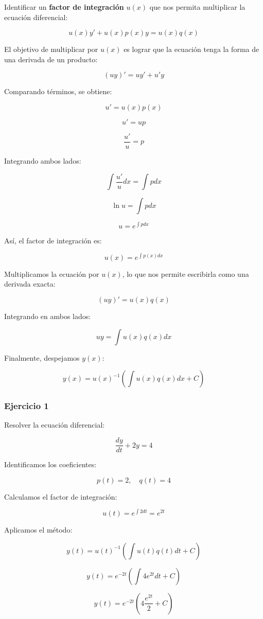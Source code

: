 Identificar un \textbf{factor de integración} \( u(x) \) que nos permita multiplicar la ecuación diferencial:

\[
u( x) y' + u( x) p( x) y = u( x) q( x)
\]

El objetivo de multiplicar por \( u(x) \) es lograr que la ecuación tenga la forma de una derivada de un producto:

\[
(u y)' = u y' + u' y
\]

Comparando términos, se obtiene:

\[
u' = u( x) p( x)
\]

\[
u' = up
\]

\[
\frac{u'}{u} = p
\]

Integrando ambos lados:

\[
\int \frac{u'}{u} dx = \int p dx
\]

\[
\ln u = \int p dx
\]

\[
u = e^{\int p dx}
\]

Así, el factor de integración es:

\[
u( x) = e^{\int p( x) dx}
\]

Multiplicamos la ecuación por \( u(x) \), lo que nos permite escribirla como una derivada exacta:

\[
( u y)' = u( x) q( x)
\]

Integrando en ambos lados:

\[
u y = \int u( x) q( x) dx
\]

Finalmente, despejamos \( y(x) \):

\[
y( x) = u( x)^{-1} \left(\int u( x) q( x) dx + C\right)
\]


\subsubsection{Ejercicio 1}

Resolver la ecuación diferencial:

\[
\frac{dy}{dt} +2y = 4
\]

Identificamos los coeficientes:

\[
p(t) = 2, \quad q(t) = 4
\]

Calculamos el factor de integración:

\[
u(t) = e^{\int 2dt} = e^{2t}
\]

Aplicamos el método:

\[
y(t) = u(t)^{-1} \left(\int u(t) q(t) dt +C\right)
\]

\[
y(t) = e^{-2t} \left(\int 4e^{2t} dt +C\right)
\]

\[
y(t) = e^{-2t} \left( 4\frac{e^{2t}}{2} +C\right)
\]

